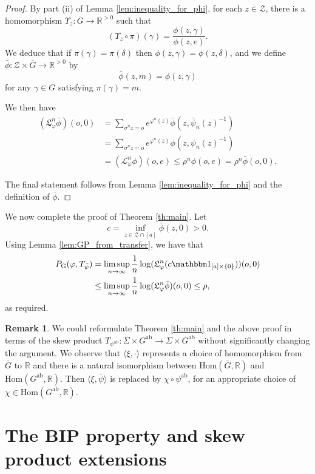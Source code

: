 \documentclass[11pt,letterpaper]{amsart}
\theoremstyle{definition}
\newtheorem{remark}[theorem]{Remark}
\numberwithin{equation}{section}
\numberwithin{theorem}{section}
\def\R{\mathbb{R}}
\def\vp{\varphi}
\def\R{\mathbb R}
\def\PG{P_{\mathrm{G}}}
\def\Gab{G^{\mathrm{ab}}}
\def\oG{\overline{G}}
\begin{document}
\begin{proof}
By part (ii) of Lemma \ref{lem:inequality_for_phi}, for each $z \in \mathcal Z$,
there is a homomorphism
$\Upsilon_z : \oG \to \mathbb R^{>0}$ such that
\[
(\Upsilon_z \circ \pi)(\gamma) = \frac{\phi(z,\gamma)}{\phi(z,e)}.
\]
We deduce that if $\pi(\gamma)=\pi(\delta)$ then $\phi(z,\gamma)=\phi(z,\delta)$,
and we define $\bar\phi :\mathcal Z \times \oG \to \mathbb R^{>0}$ by
\[
\bar \phi(z,m) = \phi(z,\gamma)
\]
for any $\gamma \in G$ satisfying $\pi(\gamma)=m$.

We then have
\begin{align*}
(\mathfrak L_\vp^n\bar\phi)(o,0) &=
\sum_{\sigma^n z=o} e^{\vp^n(z)} \bar\phi(z,\bar{\psi}_n(z)^{-1})
\\
&=
\sum_{\sigma^n z=o} e^{\vp^n(z)} \phi(z,\psi_n(z)^{-1})
\\
&= (\mathcal L_\vp^n\phi)(o,e) \le \rho^n\phi(o,e) = \rho^n \bar\phi(o,0).
\end{align*}

The final statement follows from Lemma \ref{lem:inequality_for_phi} and the definition
of $\bar \phi$.
\end{proof}


We now complete the proof of Theorem \ref{th:main}.
Let 
\[
c = \inf_{z \in \mathcal Z \cap [a]} \bar\phi(z,0)>0.
\]
Using Lemma \ref{lem:GP_from_transfer}, we have that
\begin{align*}
\PG(\vp,T_{\bar \psi}) 
&=
\limsup_{n \to \infty}\frac{1}{n} \log (\mathfrak L_\vp^n (c\mathbbm 1_{[a] \times \{0\}}))(o,0)
\\
&\le 
\limsup_{n \to \infty}\frac{1}{n} \log (\mathfrak L_\vp^n \bar \phi)(o,0)
\le \rho,
\end{align*}
as required.

\begin{remark}
We could reformulate Theorem \ref{th:main} and the above proof in terms of the skew product
$T_{\psi^{\mathrm{ab}}} : \Sigma \times \Gab \to \Sigma \times \Gab$ without significantly changing the argument.
We observe that $\langle \xi,\cdot \rangle$ represents a choice of homomorphism from $\oG$ to $\R$ and 
there is a natural isomorphism between $\mathrm{Hom}(\oG,\R)$ and $\mathrm{Hom}(\Gab,\R)$.
Then $\langle \xi, \bar \psi \rangle$ is replaced by $\chi \circ \psi^{\mathrm{ab}}$, for an appropriate 
choice of $\chi \in \mathrm{Hom}(\Gab,\R)$.
\end{remark}

\section{The BIP property and skew product extensions}\label{sec:bip}
\end{document}
